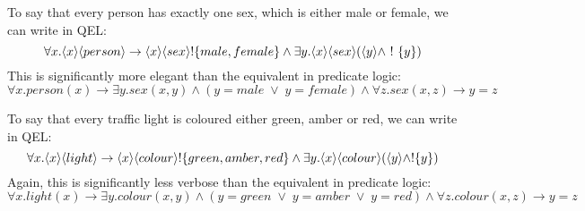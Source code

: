 To say that every person has exactly one sex, which is either male or female, we can write in QEL:
\[
\forall x . \langle x \rangle \langle person \rangle \rightarrow \langle x \rangle \langle sex \rangle ! \{male, female\} \land \exists y . \langle x \rangle \langle sex \rangle (\langle y \rangle \land \ ! \  \{y\})
\]
This is significantly more elegant than the equivalent in predicate logic:
\[
\forall x. person(x) \rightarrow \exists y . sex(x,y) \land (y = male \; \lor \; y = female) \land \forall z . sex(x,z) \rightarrow y = z
\]

To say that every traffic light is coloured either green, amber or red, we can write in QEL:
\[
\forall x. \langle x \rangle \langle light \rangle \rightarrow \langle x \rangle \langle colour \rangle !\{green, amber, red\} \land \exists y . \langle x \rangle \langle colour \rangle (\langle y \rangle \land !\{y\})
\]
Again, this is significantly less verbose than the equivalent in predicate logic:
\[
\forall x. light(x) \rightarrow \exists y . colour(x,y) \land (y = green \; \lor \; y = amber \; \lor \; y = red) \land \forall z . colour(x,z) \rightarrow y = z
\]
